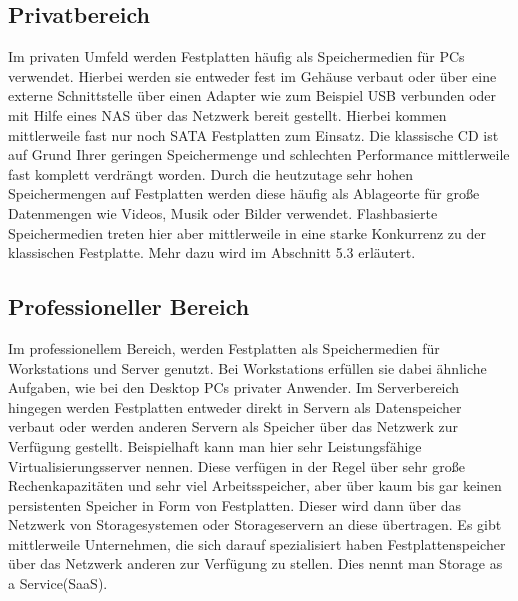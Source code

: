 \documentclass[a4paper, DIV20, 12pt, headsepline, parskip, flushleft]{scrartcl}
\begin{document}
\subsection{Privatbereich}
Im privaten Umfeld werden Festplatten häufig als Speichermedien für PCs verwendet. Hierbei werden sie entweder fest im Gehäuse verbaut oder über eine externe Schnittstelle über einen Adapter wie zum Beispiel USB verbunden oder mit Hilfe eines NAS über das Netzwerk bereit gestellt.
Hierbei kommen mittlerweile fast nur noch SATA Festplatten zum Einsatz. \newline
Die klassische CD ist auf Grund Ihrer geringen Speichermenge und schlechten Performance mittlerweile fast komplett verdrängt worden. Durch die heutzutage sehr hohen Speichermengen auf Festplatten werden diese häufig als Ablageorte für große Datenmengen wie Videos, Musik oder Bilder verwendet. \newline Flashbasierte Speichermedien treten hier aber mittlerweile in eine starke Konkurrenz zu der klassischen Festplatte. Mehr dazu wird im Abschnitt 5.3 erläutert.
\subsection{Professioneller Bereich}
Im professionellem Bereich, werden Festplatten als Speichermedien für Workstations und Server genutzt.
Bei Workstations erfüllen sie dabei ähnliche Aufgaben, wie bei den Desktop PCs privater Anwender.
Im Serverbereich hingegen werden Festplatten entweder direkt in Servern als Datenspeicher verbaut oder werden anderen Servern als Speicher über das Netzwerk zur Verfügung gestellt. Beispielhaft kann man hier sehr Leistungsfähige Virtualisierungsserver nennen. Diese verfügen in der Regel über sehr große Rechenkapazitäten und sehr viel Arbeitsspeicher, aber über kaum bis gar keinen persistenten Speicher in Form von Festplatten. Dieser wird dann über das Netzwerk von Storagesystemen oder Storageservern an diese übertragen.
Es gibt mittlerweile Unternehmen, die sich darauf spezialisiert haben Festplattenspeicher über das Netzwerk anderen zur Verfügung zu stellen. Dies nennt man Storage as a Service(SaaS). 
\end{document}
